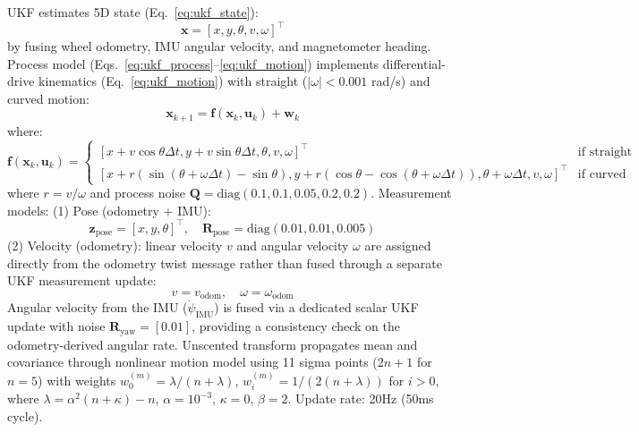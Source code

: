 \documentclass[pdflatex,sn-nature]{sn-jnl}%
\begin{document}
UKF estimates 5D state (Eq.~\ref{eq:ukf_state}):
\begin{equation}
\mathbf{x} = [x, y, \theta, v, \omega]^\top
\label{eq:ukf_state}
\end{equation}
by fusing wheel odometry, IMU angular velocity, and magnetometer heading. Process model (Eqs.~\ref{eq:ukf_process}--\ref{eq:ukf_motion}) implements differential-drive kinematics (Eq.~\ref{eq:ukf_motion}) with straight ($|\omega| < 0.001$ rad/s) and curved motion:
\begin{equation}
\mathbf{x}_{k+1} = \mathbf{f}(\mathbf{x}_k, \mathbf{u}_k) + \mathbf{w}_k
\label{eq:ukf_process}
\end{equation}
where:
\begin{equation}
\mathbf{f}(\mathbf{x}_k, \mathbf{u}_k) = \begin{cases}
[x + v\cos\theta \Delta t, y + v\sin\theta \Delta t, \theta, v, \omega]^\top & \text{if straight} \\
[x + r(\sin(\theta+\omega\Delta t)-\sin\theta), y + r(\cos\theta-\cos(\theta+\omega\Delta t)), \theta+\omega\Delta t, v, \omega]^\top & \text{if curved}
\end{cases}
\label{eq:ukf_motion}
\end{equation}
where $r = v/\omega$ and process noise $\mathbf{Q} = \text{diag}(0.1, 0.1, 0.05, 0.2, 0.2)$. Measurement models: (1) Pose (odometry + IMU):
\begin{equation}
\mathbf{z}_{\text{pose}} = [x, y, \theta]^\top, \quad \mathbf{R}_{\text{pose}} = \text{diag}(0.01, 0.01, 0.005)
\label{eq:measurement_pose}
\end{equation}
(2) Velocity (odometry): linear velocity $v$ and angular velocity $\omega$ are assigned directly from the odometry twist message rather than fused through a separate UKF measurement update:
\begin{equation}
v = v_{\text{odom}}, \quad \omega = \omega_{\text{odom}}
\label{eq:velocity_direct}
\end{equation}
Angular velocity from the IMU ($\dot{\psi}_{\text{IMU}}$) is fused via a dedicated scalar UKF update with noise $\mathbf{R}_{\text{yaw}} = [0.01]$, providing a consistency check on the odometry-derived angular rate.
Unscented transform propagates mean and covariance through nonlinear motion model using 11 sigma points ($2n+1$ for $n=5$) with weights $w_0^{(m)} = \lambda/(n+\lambda)$, $w_i^{(m)} = 1/(2(n+\lambda))$ for $i > 0$, where $\lambda = \alpha^2(n+\kappa) - n$, $\alpha = 10^{-3}$, $\kappa = 0$, $\beta = 2$. Update rate: 20Hz (50ms cycle).
\end{document}
